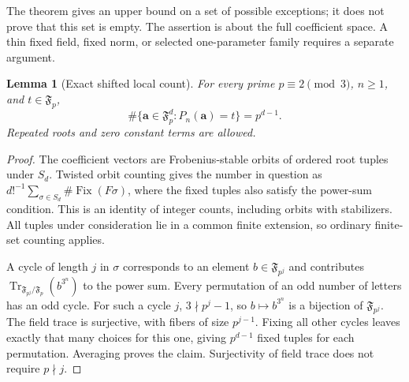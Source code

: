 \documentclass[11pt,a4paper]{article}
\newtheorem{lemma}[theorem]{Lemma}
\theoremstyle{definition}\newtheorem{definition}[theorem]{Definition}
\theoremstyle{remark}\newtheorem{remark}[theorem]{Remark}
\newcommand{\F}{\mathfrak F}\newcommand{\FF}{\mathbb F}
\begin{document}
The theorem gives an upper bound on a set of possible exceptions; it
does not prove that this set is empty. The assertion is about the
full coefficient space. A thin fixed field, fixed norm, or selected
one-parameter family requires a separate argument.

\begin{lemma}[Exact shifted local count]\label{pis:lem:shiftedcount}
For every prime $p\equiv2\pmod3$, $n\ge1$, and $t\in\F_p$,
\[
 \#\{\mathbf a\in\F_p^d:P_n(\mathbf a)=t\}=p^{d-1}.
\]
Repeated roots and zero constant terms are allowed.
\end{lemma}
\begin{proof}
The coefficient vectors are Frobenius-stable orbits of ordered root
tuples under $S_d$. Twisted orbit counting gives the number in question
as $d!^{-1}\sum_{\sigma\in S_d}\#\operatorname{Fix}(F\sigma)$,
where the fixed tuples also satisfy the power-sum condition. This is
an identity of integer counts, including orbits with stabilizers.
All tuples under consideration lie in a common finite extension, so
ordinary finite-set counting applies.

A cycle of length $j$ in $\sigma$ corresponds to an element
$b\in\F_{p^j}$ and contributes
$\operatorname{Tr}_{\F_{p^j}/\F_p}(b^{3^n})$ to the power sum.
Every permutation of an odd number of letters has an odd cycle.
For such a cycle $j$, $3\nmid p^j-1$, so $b\mapsto b^{3^n}$ is a
bijection of $\F_{p^j}$. The field trace is surjective, with fibers
of size $p^{j-1}$. Fixing all other cycles leaves exactly that many
choices for this one, giving $p^{d-1}$ fixed tuples for each
permutation. Averaging proves the claim. Surjectivity of field trace
does not require $p\nmid j$.
\end{proof}
\end{document}
